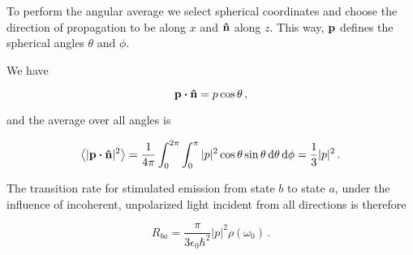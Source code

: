 \documentclass[12pt, titlepage]{article}
\newcommand{\exv}[1]{\left\langle #1 \right\rangle}
\begin{document}
To perform the angular average we select spherical coordinates and choose the direction of propagation to be along $x$ and $\vu{n}$ along $z$. This way, $\vb{p}$ defines the spherical angles $\theta$ and $\phi$.


We have

\begin{equation}
	\vb{p}\vdot\vu{n} = p\cos\theta \,,
\end{equation}

and the average over all angles is

\begin{equation}
	\exv{|\vb{p}\vdot\vu{n}|^2} = \frac{1}{4\pi}\int_{0}^{2\pi}\int_{0}^{\pi}|p|^2\cos\theta\sin\theta\dd{\theta}\dd{\phi} = \frac{1}{3}|p|^2 \,.
\end{equation}

The transition rate for stimulated emission from state $b$ to state $a$, under the influence of incoherent, unpolarized light incident from all directions is therefore

\begin{equation}
	R_{ba} = \frac{\pi}{3\epsilon_0\hbar^2}|p|^2\rho(\omega_0) \,.
\end{equation}
\end{document}
